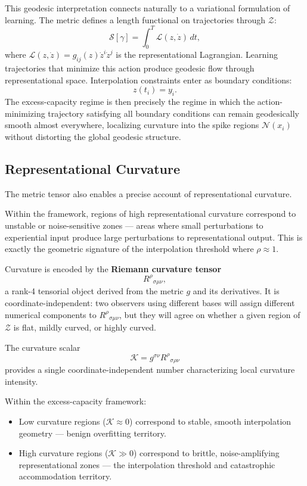 \documentclass[12pt,a4paper]{article}
\begin{document}
This geodesic interpretation connects naturally to a variational formulation of learning. The metric defines a length functional on trajectories through $\mathcal{Z}$:
\[
\mathcal{S}[\gamma] = \int_0^T \mathcal{L}(z, \dot{z}) \, dt,
\]
where $\mathcal{L}(z, \dot{z}) = g_{ij}(z)\dot{z}^i\dot{z}^j$ is the representational Lagrangian. Learning trajectories that minimize this action produce geodesic flow through representational space. Interpolation constraints enter as boundary conditions:
\[
z(t_i) = y_i.
\]
The excess-capacity regime is then precisely the regime in which the action-minimizing trajectory satisfying all boundary conditions can remain geodesically smooth almost everywhere, localizing curvature into the spike regions $\mathcal{N}(x_i)$ without distorting the global geodesic structure.

\subsection{Representational Curvature}

The metric tensor also enables a precise account of representational curvature.

Within the framework, regions of high representational curvature correspond to unstable or noise-sensitive zones --- areas where small perturbations to experiential input produce large perturbations to representational output. This is exactly the geometric signature of the interpolation threshold where $\rho \approx 1$.

Curvature is encoded by the \textbf{Riemann curvature tensor}
\[
R^{\rho}{}_{\sigma\mu\nu},
\]
a rank-4 tensorial object derived from the metric $g$ and its derivatives. It is coordinate-independent: two observers using different bases will assign different numerical components to $R^{\rho}{}_{\sigma\mu\nu}$, but they will agree on whether a given region of $\mathcal{Z}$ is flat, mildly curved, or highly curved.

The curvature scalar
\[
\mathcal{K} = g^{\sigma\nu} R^{\rho}{}_{\sigma\rho\nu}
\]
provides a single coordinate-independent number characterizing local curvature intensity.

Within the excess-capacity framework:
\begin{itemize}
\item Low curvature regions ($\mathcal{K} \approx 0$) correspond to stable, smooth interpolation geometry --- benign overfitting territory.
\item High curvature regions ($\mathcal{K} \gg 0$) correspond to brittle, noise-amplifying representational zones --- the interpolation threshold and catastrophic accommodation territory.
\end{itemize}
\end{document}
